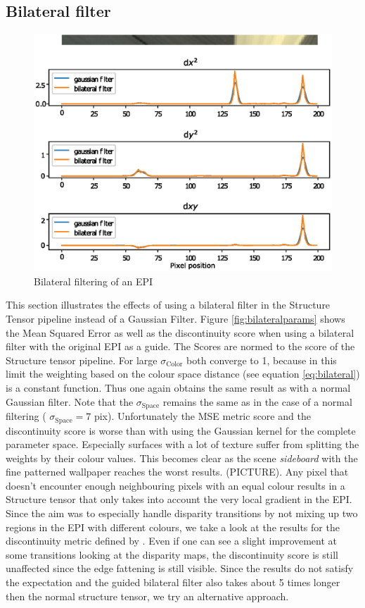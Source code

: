 \documentclass  [
  paper    = a4,
  BCOR     = 10mm,
  twoside,
  fontsize = 12pt,
  fleqn,
  toc      = bibnumbered,
  toc      = listofnumbered,
  numbers  = noendperiod,
  headings = normal,
  listof   = leveldown,
  version  = 3.03
]                                       {scrreprt}
\begin{document}
\subsection{Bilateral filter}
\begin{figure}
	\centering
	\includegraphics[width=0.7\linewidth]{images/bilat}
	\caption[Bilateral filtering]{Bilateral filtering of an EPI }
	\label{fig:bilat}
\end{figure}
 This section illustrates the effects of using a bilateral filter in the Structure Tensor pipeline instead of a Gaussian Filter. Figure \ref{fig:bilateralparams} shows the Mean Squared Error as well as the discontinuity score when using a bilateral filter with the original EPI as a guide. The Scores are normed to the score of the Structure tensor pipeline. For large $\sigma_\text{Color}$ both converge to 1, because in this limit the weighting based on the colour space distance (see equation \ref{eq:bilateral}) is a constant function. Thus one again obtains the same result as with a normal Gaussian filter. Note that the $\sigma_\text{Space}$ remains the same as in the case of a normal filtering ( $\sigma_\text{Space}=7$ pix). Unfortunately the MSE metric score and the discontinuity score is worse than with using the Gaussian kernel for the complete parameter space. Especially surfaces with a lot of texture suffer from splitting the weights by their colour values. This becomes clear as the scene \textit{sideboard} with the fine patterned wallpaper reaches the worst results. (PICTURE). Any pixel that doesn't encounter enough neighbouring pixels with an equal colour results in a Structure tensor that only takes into account the very local gradient in the EPI. Since the aim was to especially handle disparity transitions by not mixing up two regions in the EPI with different colours, we take a look at the results for the discontinuity metric defined by \cite{honauer2016benchmark}. Even if one can see a slight improvement at some transitions looking at the disparity maps, the discontinuity score is still unaffected since the edge fattening is still visible. Since the results do not satisfy the expectation and the guided bilateral filter also takes about 5 times longer then the normal structure tensor, we try an alternative approach.\\
\end{document}
